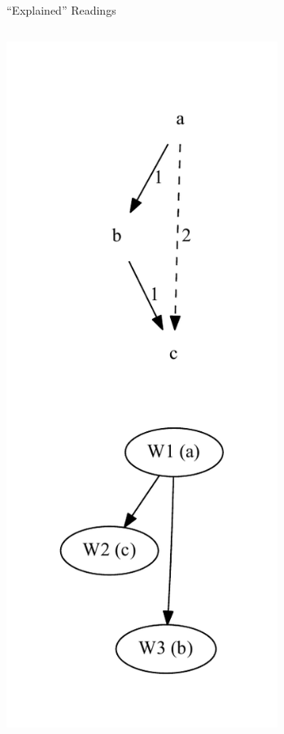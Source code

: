 \documentclass[10pt]{beamer}
\begin{document}
	\begin{frame}{``Explained'' Readings}
		\begin{columns}
			\begin{column}{0.4\textwidth}
				\centering
				\includegraphics[width=0.75\textwidth]{../graphics/transitivity-example.pdf}
			\end{column}
			\begin{column}{0.55\textwidth}

\end{column}
\end{columns}
\end{frame}
\end{document}
